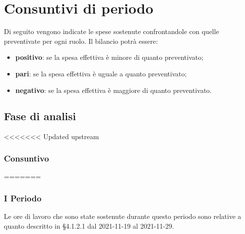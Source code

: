 \section{Consuntivi di periodo}
Di seguito vengono indicate le spese sostenute confrontandole con quelle preventivate per ogni ruolo.  Il bilancio potrà essere:
\begin{itemize}
\item \textbf{positivo}: se la spesa effettiva è minore di quanto preventivato;
\item \textbf{pari}: se la spesa effettiva è uguale a quanto preventivato;
\item \textbf{negativo}: se la spesa effettiva è maggiore di quanto preventivato.
\end{itemize}

\subsection{Fase di analisi}
<<<<<<< Updated upstream
\subsubsection{Consuntivo}
=======
\subsubsection{I Periodo}
Le ore di lavoro che sono state sostenute durante questo periodo sono relative a quanto descritto in §4.1.2.1 dal 2021-11-19 al 2021-11-29.

